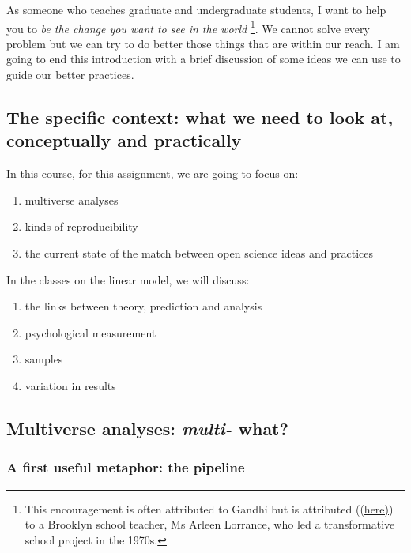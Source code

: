 \documentclass[
  letterpaper,
  DIV=11,
  numbers=noendperiod]{scrreprt}
\providecommand{\tightlist}{%
  \setlength{\itemsep}{0pt}\setlength{\parskip}{0pt}}\usepackage{longtable,booktabs,array}
\begin{document}
As someone who teaches graduate and undergraduate students, I want to
help you to \emph{be the change you want to see in the world}
\footnote{This encouragement is often attributed to Gandhi but is
  attributed
  (\href{https://professorbuzzkill.com/gandhi-be-the-change-you-wish-to-see-in-the-world/}{(here)})
  to a Brooklyn school teacher, Ms Arleen Lorrance, who led a
  transformative school project in the 1970s.}. We cannot solve every
problem but we can try to do better those things that are within our
reach. I am going to end this introduction with a brief discussion of
some ideas we can use to guide our better practices.

\hypertarget{sec-context-conceptual-practical}{%
\subsection{The specific context: what we need to look at, conceptually
and practically}\label{sec-context-conceptual-practical}}

In this course, for this assignment, we are going to focus on:

\begin{enumerate}
\def\labelenumi{\arabic{enumi}.}
\tightlist
\item
  multiverse analyses
\item
  kinds of reproducibility
\item
  the current state of the match between open science ideas and
  practices
\end{enumerate}

In the classes on the linear model, we will discuss:

\begin{enumerate}
\def\labelenumi{\arabic{enumi}.}
\setcounter{enumi}{3}
\tightlist
\item
  the links between theory, prediction and analysis
\item
  psychological measurement
\item
  samples
\item
  variation in results
\end{enumerate}

\hypertarget{sec-multi-what}{%
\subsection{\texorpdfstring{Multiverse analyses: \emph{multi-}
what?}{Multiverse analyses: multi- what?}}\label{sec-multi-what}}

\hypertarget{sec-pipeline}{%
\subsubsection{A first useful metaphor: the
pipeline}\label{sec-pipeline}}
\end{document}
